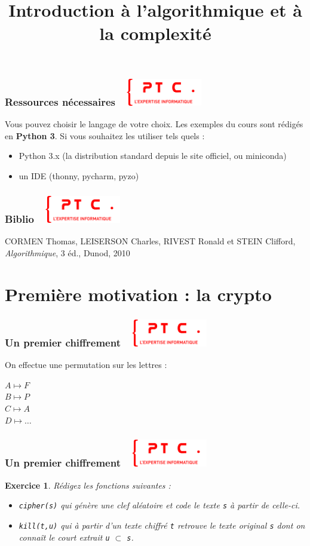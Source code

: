 \documentclass[11pt]{beamer}
\title{Introduction à l'algorithmique et à la complexité}
\author{}
\date{}
\newenvironment{slide}[1]{%
\begin{frame}[environment=slide]
\frametitle{#1~\hfill~\includegraphics[height=1.2cm]{./epitech.png}}
}{%
\end{frame}
}
\newtheorem{exercice}{Exercice}
\begin{document}
\begin{slide}{Ressources nécessaires}

Vous pouvez choisir le langage de votre choix. Les exemples du cours sont rédigés en \textbf{Python 3}. Si vous souhaitez les utiliser tels quels :

\vspace{0.2cm}

\begin{itemize}
	\item Python 3.x (la distribution standard depuis le site officiel, ou miniconda)
	\item un IDE (thonny, pycharm, pyzo)
\end{itemize}

\end{slide}

\begin{slide}{Biblio}
CORMEN Thomas, LEISERSON Charles, RIVEST Ronald et STEIN Clifford, \textit{Algorithmique}, 3 éd., Dunod, 2010
\end{slide}

\section{Première motivation : la crypto}

\begin{slide}{Un premier chiffrement}

On effectue une permutation sur les lettres :\\
\begin{center}
$A \mapsto F$\\
$B \mapsto P$\\
$C \mapsto A$\\
$D \mapsto \ldots$
\end{center}

\end{slide}

\begin{slide}{Un premier chiffrement}

\begin{exercice}
Rédigez les fonctions suivantes :
\begin{itemize}
	\item \texttt{cipher(s)} qui génère une clef aléatoire et code le texte \texttt{s} à partir de celle-ci.
	\pause
	\item \texttt{kill(t,u)} qui à partir d'un texte chiffré \texttt{t} retrouve le texte original \texttt{s} dont on connaît le court extrait \texttt{u} $\subset$ \texttt{s}.
\end{itemize}
\end{exercice}

\end{slide}
\end{document}

